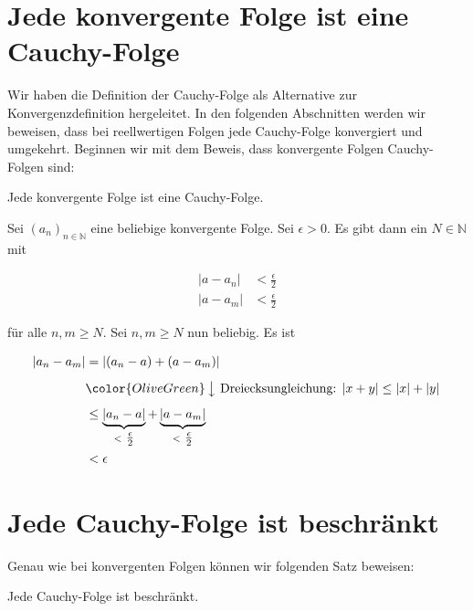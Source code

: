 \documentclass[fontsize=9pt,
               parskip=half-,
               DIV=14,
               listof=chapterentry,
               tocflat]{scrbook}
\begin{document}
\section{Jede konvergente Folge ist eine Cauchy-Folge}

Wir haben die Definition der Cauchy-Folge als Alternative zur Konvergenzdefinition hergeleitet. In den folgenden Abschnitten werden wir beweisen, dass bei reellwertigen Folgen jede Cauchy-Folge konvergiert und umgekehrt. Beginnen wir mit dem Beweis, dass konvergente Folgen Cauchy-Folgen sind:

\begin{theorem*}
Jede konvergente Folge ist eine Cauchy-Folge.

\end{theorem*}

\begin{proof*}
Sei $(a_{n})_{n\in \mathbb {N} }$ eine beliebige konvergente Folge. Sei $\epsilon >0$. Es gibt dann ein $N\in \mathbb {N} $ mit

\begin{align*}
|a-a_{n}|&<{\tfrac {\epsilon }{2}}\\|a-a_{m}|&<{\tfrac {\epsilon }{2}}
\end{align*}

für alle $n,m\geq N$. Sei $n,m\geq N$ nun beliebig. Es ist

\begin{align*}
|a_{n}-a_{m}|&=|(a_{n}-a)+(a-a_{m})|\\[0.5em]&{\color {OliveGreen}\left\downarrow \ {\text{Dreiecksungleichung: }}|x+y|\leq |x|+|y|\right.}\\[0.5em]&\leq \underbrace {|a_{n}-a|} _{<\ {\tfrac {\epsilon }{2}}}+\underbrace {|a-a_{m}|} _{<\ {\tfrac {\epsilon }{2}}}\\&<\epsilon 
\end{align*}

\end{proof*}

\section{Jede Cauchy-Folge ist beschränkt}

Genau wie bei konvergenten Folgen können wir folgenden Satz beweisen:

\begin{theorem*}
Jede Cauchy-Folge ist beschränkt.

\end{theorem*}
\end{document}
